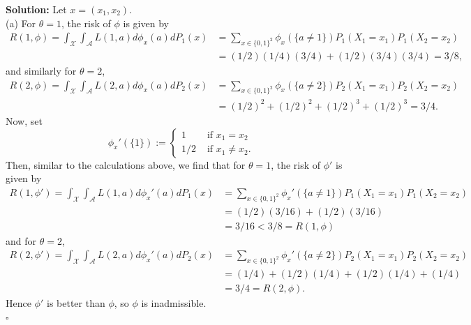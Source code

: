 \documentclass[12pt]{article}
\newcounter{ProofCounter}
\newenvironment{Solution}{\stepcounter{ProofCounter}\textbf{Solution:}}{\hfill$\square$}
\begin{document}
\begin{Solution}
  Let $x = (x_1, x_2)$.  \\
  
  (a) For $\theta = 1$, the risk of $\phi$ is given by 
  \begin{align*}
    R(1, \phi) = \int_{\mathcal{X}}\int_{\mathcal{A}} L(1, a)d\phi_{x}(a)dP_1(x) & = \sum_{x \in \{0,1\}^2} \phi_x(\{a \neq 1\}) P_1(X_1=x_1)P_1(X_2 =
    x_2) \\
    & = (1/2)(1/4)(3/4) + (1/2)(3/4)(3/4) = 3/8,
  \end{align*}
  and similarly for $\theta = 2$,
  \begin{align*}
    R(2,\phi) = \int_{\mathcal{X}}\int_{\mathcal{A}} L(2, a)d\phi_{x}(a)dP_2(x) & = \sum_{x \in \{0,1\}^2} \phi_x(\{a \neq 2\}) P_2(X_1=x_1)P_2(X_2 =
    x_2) \\
    & = (1/2)^2 + (1/2)^2 + (1/2)^3 + (1/2)^3 = 3/4.
  \end{align*}
  Now, set 
  \[
    \phi_x'(\{1\}) := \left\{ \begin{array}{cl} 1 & \text{ if } x_1 = x_2 \\ 1/2 & \text{ if } x_1 \neq x_2. \end{array} \right. 
  \]
  Then, similar to the calculations above, we find that for $\theta = 1$, the risk of $\phi'$ is given by 
  \begin{align*}
    R(1, \phi') = \int_{\mathcal{X}}\int_{\mathcal{A}} L(1, a)d\phi_{x}'(a)dP_1(x) & = \sum_{x \in \{0,1\}^2} \phi_x'(\{a \neq 1\}) P_1(X_1=x_1)P_1(X_2 =
    x_2) \\
    & = (1/2)(3/16) + (1/2)(3/16) \\
    & = 3/16 < 3/8 = R(1,\phi)
  \end{align*}
  and for $\theta = 2$,
  \begin{align*}
    R(2,\phi') = \int_{\mathcal{X}}\int_{\mathcal{A}} L(2, a)d\phi_{x}'(a)dP_2(x) & = \sum_{x \in \{0,1\}^2} \phi_x'(\{a \neq 2\}) P_2(X_1=x_1)P_2(X_2 =
    x_2) \\
    & = (1/4) + (1/2)(1/4) + (1/2)(1/4) + (1/4) \\
    & = 3/4 = R(2, \phi).
  \end{align*}
  Hence $\phi'$ is better than $\phi$, so $\phi$ is inadmissible. \\


\end{Solution}
\end{document}
